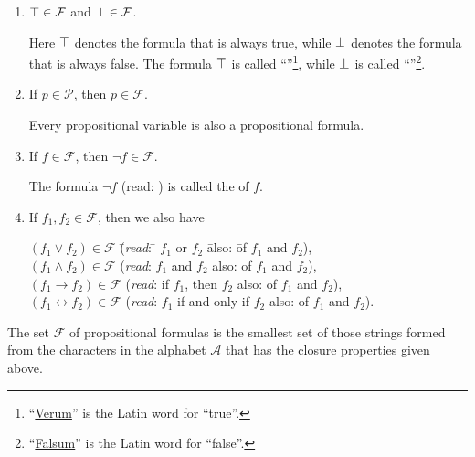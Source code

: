 \begin{enumerate}
\item $\top \in \mathcal{F}$ and $\bot \in \mathcal{F}$.

      Here $\top$   denotes the formula that is always true, while $\bot$
        denotes the formula that is always false.
      The formula $\top$ is called
      ``''\footnote{``\href{https://translate.google.com/?sl=la&tl=en&text=falsum&op=translate&hl=en}{Verum}''
        is the Latin word for ``true''.},  while $\bot$ is called 
      ``''\footnote{``\href{https://translate.google.com/?sl=la&tl=en&text=falsum&op=translate&hl=en}{Falsum}''
        is the Latin word for ``false''.}.  
\item If $p \in \mathcal{P}$, then  $p \in \mathcal{F}$.

      Every propositional variable is also a propositional formula.
\item If $f \in \mathcal{F}$, then  $\neg f \in \mathcal{F}$.

      The formula  $\neg f$  (read: ) is called the  of $f$.
\item If $f_1, f_2 \in \mathcal{F}$, then we also have
      \begin{tabbing}
        $(f_1 \vee f_2) \in \mathcal{F}$  \hspace*{0.5cm} \= (\textsl{read}: \quad \= $f_1$ or $f_2$ \hspace*{2.3cm} \=
         also: \qquad\= of $f_1$ and $f_2$), \\
        $(f_1 \wedge f_2) \in \mathcal{F}$  \> (\textsl{read}: \> $f_1$ and $f_2$ \>
         also: \> of $f_1$ and $f_2$), \\
        $(f_1 \rightarrow f_2) \in \mathcal{F}$  \> (\textsl{read}:       \> if $f_1$, then $f_2$ \>
         also: \> of $f_1$ and $f_2$), \\
        $(f_1 \leftrightarrow f_2) \in \mathcal{F}$  \>
        (\textsl{read}:       \> $f_1$ if and only if $f_2$ \>
        also: \> of $f_1$ and $f_2$).            
      \end{tabbing}
\end{enumerate}
The set  $\mathcal{F}$ of propositional formulas is the smallest set of those strings formed from the characters
in the alphabet $\mathcal{A}$ that has the closure properties given above.

